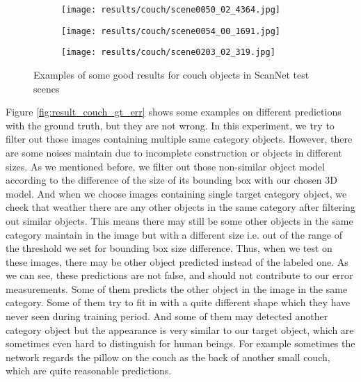 \begin{figure}[h!]
  \begin{subfigure}[b]{0.32\linewidth}
    \texttt{[image: results/couch/scene0050\_02\_4364.jpg]}
  \end{subfigure}
  \begin{subfigure}[b]{0.32\linewidth}
    \texttt{[image: results/couch/scene0054\_00\_1691.jpg]}
  \end{subfigure}
  \begin{subfigure}[b]{0.32\linewidth}
    \texttt{[image: results/couch/scene0203\_02\_319.jpg]}
  \end{subfigure}
  \caption{Examples of some good results for couch objects in ScanNet test scenes}
  \label{fig:result_couch}
\end{figure}

Figure \ref{fig:result_couch_gt_err} shows some examples on different predictions with the ground truth, but they are not wrong. In this experiment, we try to filter out those images containing multiple same category objects. However, there are some noises maintain due to incomplete construction or objects in different sizes. As we mentioned before, we filter out those non-similar object model according to the difference of the size of its bounding box with our chosen 3D model. And when we choose images containing single target category object, we check that weather there are any other objects in the same category after filtering out similar objects. This means there may still be some other objects in the same category maintain in the image but with a different size i.e. out of the range of the threshold we set for bounding box size difference. Thus, when we test on these images, there may be other object predicted instead of the labeled one. As we can see, these predictions are not false, and should not contribute to our error measurements. Some of them predicts the other object in the image in the same category. Some of them try to fit in with a quite different shape which they have never seen during training period. And some of them may detected another category object but the appearance is very similar to our target object, which are sometimes even hard to distinguish for human beings. For example sometimes the network regards the pillow on the couch as the back of another small couch, which are quite reasonable predictions.

